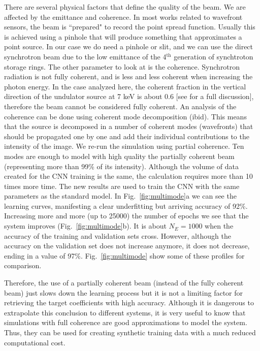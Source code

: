 \documentclass[preprint]{iucr}
\begin{document}
There are several physical factors that define the quality of the beam. We are affected by the emittance and coherence. In most works related to wavefront sensors, the beam is ``prepared" to record the point spread function. Usually this is achieved using a pinhole that will produce something that approximates a point source. In our case we do need a pinhole or slit, and we can use the direct synchrotron beam due to the low emittance of the 4$^\text{th}$ generation of synchtroton storage rings. The other parameter to look at is the coherence. Synchrotron radiation is not fully coherent, and is less and less coherent when increasing the photon energy. In the case analyzed here, the coherent fraction in the vertical direction of the undulator source at 7 keV is about 0.6 [see \cite{multioptics} for a full discussion], therefore the beam cannot be considered fully coherent. An analysis of the coherence can be done using coherent mode decomposition (ibid). This means that the source is decomposed in a number of coherent modes (wavefronts) that should be propagated one by one and add their individual contributions to the intensity of the image. We re-run the simulation using partial coherence. Ten modes are enough to model with high quality the partially coherent beam (representing more than 99\% of its intensity). Although the volume of data created for the CNN training is the same, the calculation requires more than 10 times more time. The new results are used to train the CNN with the same parameters as the standard model. In Fig.~\ref{fig:multimode}a we can see the learning curves, manifesting a clear underfitting but arriving accuracy of 92\%. Increasing more and more (up to 25000) the number of epochs we see that the system improves (Fig.~\ref{fig:multimode}b). It is about $N_E=1000$ when the accuracy of the training and validation sets cross. However, although the accuracy on the validation set does not increase anymore, it does not decrease, ending in a value of 97\%. Fig.~\ref{fig:multimode} show some of these profiles for comparison.

Therefore, the use of a partially coherent beam (instead of the fully coherent beam) just slows down the learning process but it is not a limiting factor for retrieving the target coefficients with high accuracy. Although it is dangerous to extrapolate this conclusion to different systems, it is very useful to know that simulations with full coherence are good approximations to model the system. Thus, they can be used for creating synthetic training data with a much reduced computational cost. 
\end{document}
